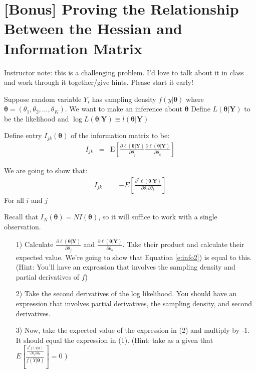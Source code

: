\documentclass[letterpaper,12pt]{article}
\numberwithin{equation}{section}
\numberwithin{equation}{section}
\begin{document}
\section{[Bonus] Proving the Relationship Between the Hessian and Information Matrix}

\noindent Instructor note: this is a challenging problem.  I'd love to talk about it in class and work through it together/give hints. Please start it early!


Suppose random variable $Y_{i}$ has sampling density $f(y|\boldsymbol{\theta})$ where $\boldsymbol{\theta} = (\theta_{1}, \theta_{2}, \hdots, \theta_{K})$.  We want to make an inference about $\boldsymbol{\theta}$ Define $L(\boldsymbol{\theta}|\boldsymbol{Y})$ to be the likelihood and $\log L(\boldsymbol{\theta}|\boldsymbol{Y}) \equiv l(\boldsymbol{\theta}|\boldsymbol{Y})$

Define entry $I_{jk}(\boldsymbol{\theta})$ of the information matrix to be:
\begin{eqnarray}
I_{jk} & = & \text{E}[\frac{\partial \ell(\boldsymbol{\theta}|\boldsymbol{Y}) }{\partial \theta_{j}} \frac{\partial \ell(\boldsymbol{\theta}|\boldsymbol{Y}) }{\partial \theta_{k}}] \label{e:info1}
\end{eqnarray}

We are going to show that:
\begin{eqnarray}
I_{jk} & = & - E[\frac{\partial^2 \ell(\boldsymbol{\theta}|\boldsymbol{Y}) }{\partial \theta_{j} \partial \theta_{k} }] \label{e:info2}
\end{eqnarray}
For all $i$ and $j$

Recall that $I_{N}(\boldsymbol{\theta}) = N I(\boldsymbol{\theta})$, so it will suffice to work with a single observation.
\begin{itemize}
\item[1)] Calculate $\frac{\partial \ell(\boldsymbol{\theta}|\boldsymbol{Y}) }{\partial \theta_{j}} $ and $ \frac{\partial \ell(\boldsymbol{\theta}|\boldsymbol{Y}) }{\partial \theta_{k}}$.  Take their product and calculate their expected value.  We're going to show that Equation \ref{e:info2}) is equal to this.  (Hint: You'll have an expression that involves the sampling density and partial derivatives of $f$)
\item[2)] Take the second derivatives of the log likelihood.  You should have an expression that involves partial derivatives, the sampling density, and second derivatives.
\item[3)] Now, take the expected value of the expression in (2) and multiply by -1.  It should  equal the expression in (1).  (Hint: take as a given that
$E[\frac{\frac{\partial^2 f(Y|\boldsymbol{\theta} )}{\partial \theta_{j} \partial \theta_{k}}}{f(Y|\boldsymbol{\theta})}] = 0 $
)
\end{itemize}
\end{document}
